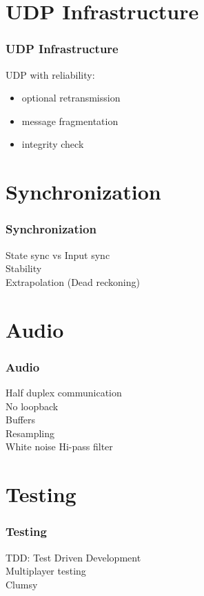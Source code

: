 \documentclass{beamer}
\begin{document}
\section{UDP Infrastructure}
\begin{frame}
	\frametitle{UDP Infrastructure}
UDP with reliability:
\begin{itemize}
	\item optional retransmission
	\item message fragmentation
	\item integrity check
\end{itemize}
\end{frame}


\section{Synchronization}
\begin{frame}
	\frametitle{Synchronization}
State sync vs Input sync \\
Stability \\
Extrapolation (Dead reckoning)\\
\end{frame}

\section{Audio}
\begin{frame}
	\frametitle{Audio}
Half duplex communication \\
No loopback \\
Buffers \\
Resampling \\
White noise 
Hi-pass filter \\
\end{frame}


\section{Testing}
\begin{frame}
	\frametitle{Testing}
TDD: Test Driven Development \\
Multiplayer testing \\
Clumsy \\
\end{frame}
\end{document}
